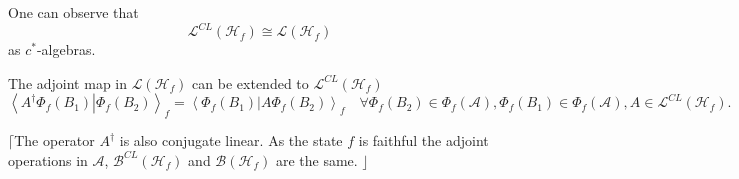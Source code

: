 \documentclass[aps,preprint]{revtex4}%
\begin{document}
One can observe that
\begin{equation}
\mathcal{L}^{CL}\left(  \mathcal{H}_{f}\right)  \cong\mathcal{L}\left(
\mathcal{H}_{f}\right)
\end{equation}
as $c^{\ast}$-algebras.

The adjoint map in $\mathcal{L}\left(  \mathcal{H}_{f}\right)  $ can be
extended to $\mathcal{L}^{CL}\left(  \mathcal{H}_{f}\right)  $
\begin{equation}
\left\langle \left.  A^{\dagger}\Phi_{f}\left(  B_{1}\right)  \right\vert
\Phi_{f}\left(  B_{2}\right)  \right\rangle _{f}=\left\langle \left.  \Phi
_{f}\left(  B_{1}\right)  \right\vert A\Phi_{f}\left(  B_{2}\right)
\right\rangle _{f}\quad\forall\Phi_{f}\left(  B_{2}\right)  \in\Phi_{f}\left(
\mathcal{A}\right)  ,\Phi_{f}\left(  B_{1}\right)  \in\Phi_{f}\left(
\mathcal{A}\right)  ,A\in\mathcal{L}^{CL}\left(  \mathcal{H}_{f}\right)  .
\end{equation}


$\lceil$The operator $A^{\dagger}$ is also conjugate linear. As the state $f$
is faithful the adjoint operations in $\mathcal{A}$, $\mathcal{B}^{CL}\left(
\mathcal{H}_{f}\right)  $ and $\mathcal{B}\left(  \mathcal{H}_{f}\right)  $
are the same. $\rfloor$
\end{document}
